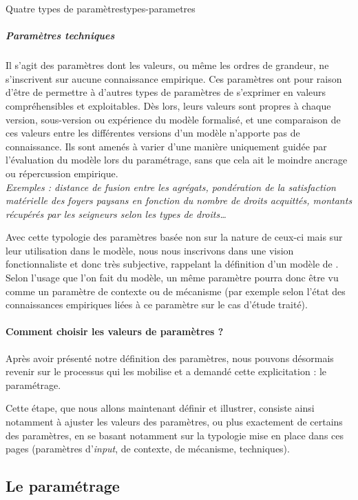 \begin{encadre}{Quatre types de paramètres}{types-parametres}
\subparagraph*{Paramètres techniques}
	Il s'agit des paramètres dont les valeurs, ou même les ordres de grandeur, ne s'inscrivent sur aucune connaissance empirique.
	Ces paramètres ont pour raison d'être de permettre à d'autres types de paramètres de s'exprimer en valeurs compréhensibles et exploitables.
	Dès lors, leurs valeurs sont propres à chaque version, sous-version ou expérience du modèle formalisé, et une comparaison de ces valeurs entre les différentes versions d'un modèle n'apporte pas de connaissance.
	Ils sont amenés à varier d'une manière uniquement guidée par l'évaluation du modèle lors du paramétrage, sans que cela ait le moindre ancrage ou répercussion empirique.\\
	\textit{Exemples : distance de fusion entre les agrégats, pondération de la satisfaction matérielle des foyers paysans en fonction du nombre de droits acquittés, montants récupérés par les seigneurs selon les types de droits\ldots}
\end{encadre}

Avec cette typologie des paramètres basée non sur la nature de ceux-ci mais sur leur utilisation dans le modèle, nous nous inscrivons dans une vision fonctionnaliste et donc très subjective, rappelant la définition d'un modèle de \citeauthor{minsky_matter_1965}.
Selon l'usage que l'on fait du modèle, un même paramètre pourra donc être vu comme un paramètre de contexte ou de mécanisme (par exemple selon l'état des connaissances empiriques liées à ce paramètre sur le cas d'étude traité).

\paragraph*{Comment choisir les valeurs de paramètres ?}


Après avoir présenté notre définition des paramètres, nous pouvons désormais revenir sur le processus qui les mobilise et a demandé cette explicitation : le paramétrage.

Cette étape, que nous allons maintenant définir et illustrer, consiste ainsi notamment à \og ajuster\fg{} les valeurs des paramètres, ou plus exactement de certains des paramètres, en se basant notamment sur la typologie mise en place dans ces pages (paramètres d'\textit{input}, de contexte, de mécanisme, techniques).

\subsection{Le paramétrage \label{subsec:parametrage-def}}


